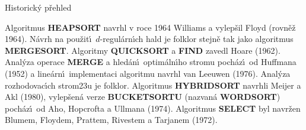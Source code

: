 \documentclass[a4paper,12pt]{article}
\begin{document}
\head
Historick\'y p\v rehled
\endhead

\flushpar Algoritmus {\bf HEAPSORT }
navrhl v roce 1964 Williams a vylep\v sil Floyd (rovn\v e\v z 1964).  N\'avrh 
na pou\v zit\'\i\ $d$-regul\'ar\-n\'\i ch hald je folklor stejn\v e tak jako  
algoritmus {\bf MER\-GESORT}.  Algoritmy {\bf QUICKSORT} a {\bf FIND }
zavedl Hoare (1962).  Anal\'yza ope\-race {\bf MERGE} a 
hled\'an\'\i\ optim\'aln\'\i ho stro\-mu poch\'az\'\i\ od Huffmana 
(1952) a line\'arn\'\i\ implementaci algoritmu navrhl van 
Leeuwen (1976).  Anal\'yza rozhodovac\'\i ch strom\accent23u je 
folklor. Algoritmus {\bf HYBRIDSORT} navrhli Meijer a Akl (1980), 
vylep\v se\-n\'a verze {\bf BUCKETSORTU} (nazvan\'a {\bf WORDSORT}) 
poch\'az\'\i\ od Aho, Hopcrofta a Ullmana (1974). Algoritmus {\bf SELECT} byl 
navr\v zen Blumem, Floydem, Prattem, Rivestem a 
Tarjanem (1972).  
\end{document}
